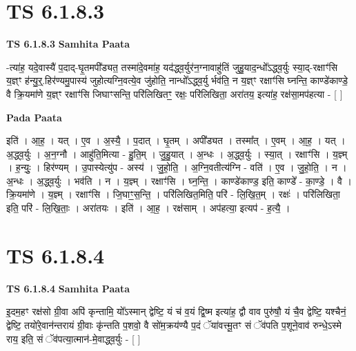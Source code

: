\documentclass[17pt]{extarticle}
\begin{document}

\section{ TS 6.1.8.3 }

\textbf{TS 6.1.8.3 } \newline
\textbf{Samhita Paata} \newline

-त्या॑ह॒ यदे॒वास्यै॑ प॒दाद्-घृ॒तमपी᳚ड्यत॒ तस्मा॑दे॒वमा॑ह॒ यद॑द्ध्व॒र्युर॑न॒ग्नावाहु॑तिं जुहु॒याद॒न्धो᳚ऽद्ध्व॒र्युः स्या॒द्-रक्षाꣳ॑सि य॒ज्ञ्ꣳ ह॑न्यु॒र्॒.हिर॑ण्यमु॒पास्य॑ जुहोत्यग्नि॒वत्ये॒व जु॑होति॒ नान्धो᳚ऽद्ध्व॒र्यु र्भव॑ति॒ न य॒ज्ञ्ꣳ रक्षाꣳ॑सि घ्नन्ति॒ काण्डे॑काण्डे॒ वै क्रि॒यमा॑णे य॒ज्ञ्ꣳ रक्षाꣳ॑सि जिघाꣳसन्ति॒ परि॑लिखितꣳ॒॒ रक्षः॒ परि॑लिखिता॒ अरा॑तय॒ इत्या॑ह॒ रक्ष॑सा॒मप॑हत्या - [  ] \newline

\textbf{Pada Paata} \newline

इति॑ । आ॒ह॒ । यत् । ए॒व । अ॒स्यै॒ । प॒दात् । घृ॒तम् । अपी᳚ड्यत । तस्मा᳚त् । ए॒वम् । आ॒ह॒ । यत् । अ॒द्ध्व॒र्युः । अ॒न॒ग्नौ । आहु॑ति॒मित्या - हु॒ति॒म् । जु॒हु॒यात् । अ॒न्धः । अ॒द्ध्व॒र्युः । स्या॒त् । रक्षाꣳ॑सि । य॒ज्ञ्म् । ह॒न्युः॒ । हिर॑ण्यम् । उ॒पास्येत्यु॑प - अस्य॑ । जु॒हो॒ति॒ । अ॒ग्नि॒वतीत्य॑ग्नि - वति॑ । ए॒व । जु॒हो॒ति॒ । न । अ॒न्धः । अ॒द्ध्व॒र्युः । भव॑ति । न । य॒ज्ञ्म् । रक्षाꣳ॑सि । घ्न॒न्ति॒ । काण्डे॑काण्ड॒ इति॒ काण्डे᳚ - का॒ण्डे॒ । वै । क्रि॒यमा॑णे । य॒ज्ञ्म् । रक्षाꣳ॑सि । जि॒घाꣳ॒॒स॒न्ति॒ । परि॑लिखित॒मिति॒ परि॑ - लि॒खि॒त॒म् । रक्षः॑ । परि॑लिखिता॒ इति॒ परि॑ - लि॒खि॒ताः॒ । अरा॑तयः । इति॑ । आ॒ह॒ । रक्ष॑साम् । अप॑हत्या॒ इत्यप॑ - ह॒त्यै॒ ।  \newline





\section{ TS 6.1.8.4 }

\textbf{TS 6.1.8.4 } \newline
\textbf{Samhita Paata} \newline

इ॒दम॒हꣳ रक्ष॑सो ग्री॒वा अपि॑ कृन्तामि॒ यो᳚ऽस्मान् द्वेष्टि॒ यं च॑ व॒यं द्वि॒ष्म इत्या॑ह॒ द्वौ वाव पुरु॑षौ॒ यं चै॒व द्वेष्टि॒ यश्चैनं॒ द्वेष्टि॒ तयो॑रे॒वान॑न्तरायं ग्री॒वाः कृ॑न्तति प॒शवो॒ वै सो॑म॒क्रय॑ण्यै प॒दं ॅया॑वत्त्मू॒तꣳ सं ॅव॑पति प॒शूने॒वाव॑ रुन्धे॒ऽस्मे राय॒ इति॒ सं ॅव॑पत्या॒त्मान॑-मे॒वाद्ध्व॒र्युः - [  ] \newline
\end{document}
